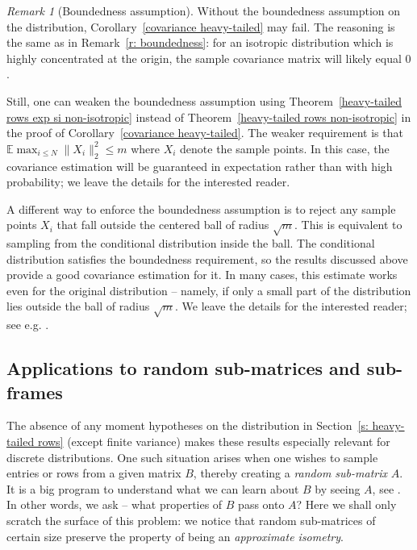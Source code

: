 \documentclass[10pt, openany]{book}
\theoremstyle{remark}
\newtheorem{remark}[theorem]{Remark}
\def \E {\mathbb{E}}
\begin{document}
\begin{remark}[Boundedness assumption]				\label{r: covariance boundedness}
  Without the boundedness assumption on the distribution, Corollary~\ref{covariance heavy-tailed}
  may fail. The reasoning is the same as in Remark~\ref{r: boundedness}:
  for an isotropic distribution which is highly concentrated at the origin, 
  the sample covariance matrix will likely equal $0$. 
  
  Still, one can weaken the boundedness assumption using Theorem~\ref{heavy-tailed rows exp si non-isotropic}
  instead of Theorem~\ref{heavy-tailed rows non-isotropic} in the proof of Corollary~\ref{covariance heavy-tailed}. 
  The weaker requirement is that $\E \max_{i \le N} \|X_i\|_2^2 \le m$ where $X_i$ denote
  the sample points. In this case, the covariance estimation will be guaranteed in expectation rather than
  with high probability; we leave the details for the interested reader.
  
  A different way to enforce the boundedness assumption is 
  to reject any sample points $X_i$ that fall outside the centered ball of radius $\sqrt{m}$. 
  This is equivalent to sampling from the conditional distribution inside the ball. 
  The conditional distribution satisfies the boundedness requirement,
  so the results discussed above provide a good covariance estimation for it. In many cases, this estimate
  works even for the original distribution -- namely, if only a small part of the 
  distribution lies outside the ball of radius $\sqrt{m}$. We leave the details for the interested reader;
  see e.g. \cite{V marginals}.
\end{remark}



\subsection{Applications to random sub-matrices and sub-frames}	
	\label{s: sub-matrices}

The absence of any moment hypotheses on the distribution in Section~\ref{s: heavy-tailed rows} 
(except finite variance) makes these results especially relevant for discrete distributions.
One such situation arises when one wishes to sample entries or rows 
from a given matrix $B$, thereby creating a {\em random sub-matrix} $A$. 
It is a big program to understand what we can learn about 
$B$ by seeing $A$, see \cite{GMDL, DKM, RV sampling}.
In other words, we ask -- what properties of $B$ pass onto $A$?
Here we shall only scratch the surface of this problem: 
we notice that random sub-matrices of certain size preserve the property of being an {\em approximate isometry}.
\end{document}
